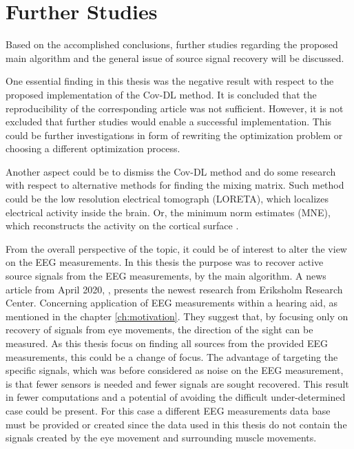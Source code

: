 \chapter{Further Studies}
Based on the accomplished conclusions, further studies regarding the proposed main algorithm and the general issue of source signal recovery will be discussed.

One essential finding in this thesis was the negative result with respect to the proposed implementation of the Cov-DL method. It is concluded that the reproducibility of the corresponding article was not sufficient. However, it is not excluded that further studies would enable a successful implementation. 
This could be further investigations in form of rewriting the optimization problem or choosing a different optimization process. 

Another aspect could be to dismiss the Cov-DL method and do some research with respect to alternative methods for finding the mixing matrix. 
Such method could be the low resolution electrical tomograph (LORETA), which localizes electrical activity inside the brain. Or, the minimum norm estimates (MNE), which reconstructs the activity on the cortical surface \cite{LORETA}.

From the overall perspective of the topic, it could be of interest to alter the view on the EEG measurements. In this thesis the purpose was to recover active source signals from the EEG measurements, by the main algorithm. 
A news article from April 2020, \cite{Ing2020}, presents the newest research from Eriksholm Research Center. Concerning application of EEG measurements within a hearing aid, as mentioned in the chapter \ref{ch:motivation}. They suggest that, by focusing only on recovery of signals from eye movements, the direction of the sight can be measured. 
As this thesis focus on finding all sources from the provided EEG measurements, this could be a change of focus. The advantage of targeting the specific signals, which was before considered as noise on the EEG measurement, is that fewer sensors is needed and fewer signals are sought recovered. This result in fewer computations and a potential of avoiding the difficult under-determined case could be present. 
For this case a different EEG measurements data base must be provided or created since the data used in this thesis do not contain the signals created by the eye movement and surrounding muscle movements.

